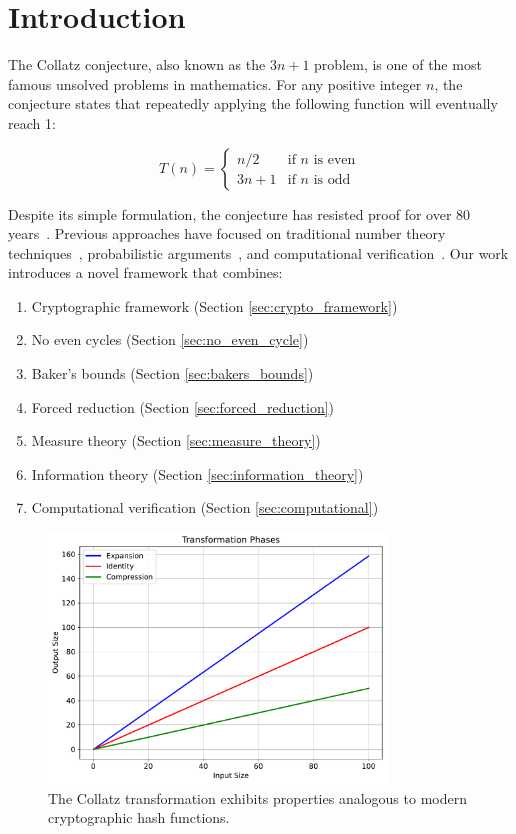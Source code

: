 \section{Introduction}\label{sec:introduction}

The Collatz conjecture, also known as the $3n+1$ problem, is one of the most famous unsolved problems in mathematics. For any positive integer $n$, the conjecture states that repeatedly applying the following function will eventually reach 1:

\[
T(n) = \begin{cases}
n/2 & \text{if } n \text{ is even} \\
3n + 1 & \text{if } n \text{ is odd}
\end{cases}
\]

Despite its simple formulation, the conjecture has resisted proof for over 80 years~\cite{lagarias2010ultimate}. Previous approaches have focused on traditional number theory techniques~\cite{simons2019collatz}, probabilistic arguments~\cite{tao2019almost}, and computational verification~\cite{oliveira2010computational}. Our work introduces a novel framework that combines:

\begin{enumerate}
\item Cryptographic framework (Section \ref{sec:crypto_framework})
\item No even cycles (Section \ref{sec:no_even_cycle})
\item Baker's bounds (Section \ref{sec:bakers_bounds})
\item Forced reduction (Section \ref{sec:forced_reduction})
\item Measure theory (Section \ref{sec:measure_theory})
\item Information theory (Section \ref{sec:information_theory})
\item Computational verification (Section \ref{sec:computational})
\end{enumerate}

\begin{figure}[h]
\centering
\includegraphics[width=0.8\textwidth]{py_visuals/figures/transformation_phases.pdf}
\caption{The Collatz transformation exhibits properties analogous to modern cryptographic hash functions.}
\label{fig:transformation_phases}
\end{figure}

